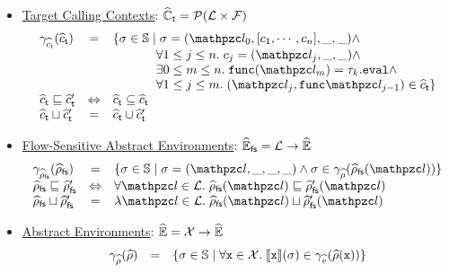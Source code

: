 \begin{itemize}
  \item \underline{Target Calling Contexts}:
    $\widehat{\mathbb{C}}_{\textsf{t}} = \mathcal{P}(\mathcal{L} \times \mathcal{F})$
    \[
      \begin{array}{lcl}
        \atctxtgamma(\atctxt) &=& \{ \st \in \stset \mid
          \st = (\lab_0, [\ctxt_1, \cdots, \ctxt_n], \_, \_) \wedge\\&&

          \phantom{\{ \st \in \stset \mid}
          \forall 1 \leq j \leq n. \; \ctxt_j = (\lab_j, \_, \_) \wedge\\&&

          \phantom{\{ \st \in \stset \mid}
          \exists 0 \leq m \leq n. \; \getfunc(\lab_m) = \ty_k.\eval \wedge\\&&

          \phantom{\{ \st \in \stset \mid}
          \forall 1 \leq j \leq m. \; (\lab_j, \getfunc{\lab_{j-1}}) \in \atctxt
        \}\\

        \atctxt \order \atctxt' &\Leftrightarrow& \atctxt \subseteq \atctxt\\

        \atctxt \join \atctxt' &=& \atctxt \cup \atctxt'\\
      \end{array}
    \]

  \item \underline{Flow-Sensitive Abstract Environments}:
    $\widehat{\mathbb{E}}_{\textsf{fs}} = \mathcal{L} \rightarrow \widehat{\mathbb{E}}$
    \[
      \begin{array}{lcl}
        \afsenvgamma(\afsenv) &=& \{ \st \in \stset \mid
          \st = (\lab, \_, \_, \_) \wedge \st \in \aenvgamma(\afsenv(\lab))
        \}\\

        \afsenv \order \afsenv' &\Leftrightarrow&
        \forall \lab \in \labset. \; \afsenv(\lab) \order \afsenv'(\lab)\\

        \afsenv \join \afsenv' &=&
        \lambda \lab \in \labset. \; \afsenv(\lab) \join \afsenv'(\lab)\\
      \end{array}
    \]

  \item \underline{Abstract Environments}:
    $\widehat{\mathbb{E}} = \mathcal{X} \rightarrow \widehat{\mathbb{E}}$
    \[
      \begin{array}{lcl}
        \gamma_{\widehat{\rho}}(\widehat{\rho}) &=& \{ \sigma \in \mathbb{S} \mid
          \forall \texttt{x} \in \mathcal{X}. \;
          \llbracket{\texttt{x}}\rrbracket(\sigma) \in \gamma_{\widehat{v}}(\widehat{\rho}(\texttt{x}))
        \}\\


\end{array}\]
\end{itemize}
